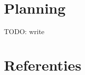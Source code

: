 \documentclass[]{article}
\theoremstyle{definition}
\begin{document}

\section{Planning}
TODO: write

\section{Referenties}


\end{document}

